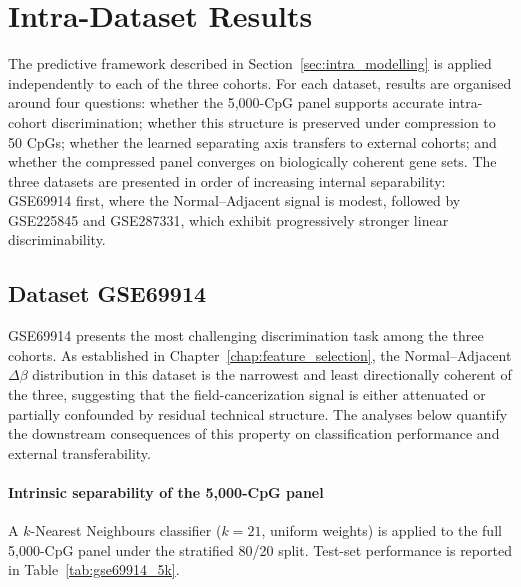 \section{Intra-Dataset Results}

The predictive framework described in Section~\ref{sec:intra_modelling}
is applied independently to each of the three cohorts. For each
dataset, results are organised around four questions: whether
the 5,000-CpG panel supports accurate intra-cohort discrimination;
whether this structure is preserved under compression to 50 CpGs;
whether the learned separating axis transfers to external cohorts;
and whether the compressed panel converges on biologically
coherent gene sets. The three datasets are presented in order
of increasing internal separability: GSE69914 first, where the
Normal--Adjacent signal is modest, followed by GSE225845 and
GSE287331, which exhibit progressively stronger linear
discriminability.

\subsection{Dataset GSE69914}
\label{sec:results_gse69914}

GSE69914 presents the most challenging discrimination task
among the three cohorts. As established in
Chapter~\ref{chap:feature_selection}, the Normal--Adjacent
$\Delta\beta$ distribution in this dataset is the narrowest
and least directionally coherent of the three, suggesting
that the field-cancerization signal is either attenuated or
partially confounded by residual technical structure. The
analyses below quantify the downstream consequences of this
property on classification performance and external
transferability.

\paragraph{Intrinsic separability of the 5,000-CpG panel}

A $k$-Nearest Neighbours classifier ($k = 21$, uniform
weights) is applied to the full 5,000-CpG panel under the
stratified 80/20 split. Test-set performance is reported in
Table~\ref{tab:gse69914_5k}.

